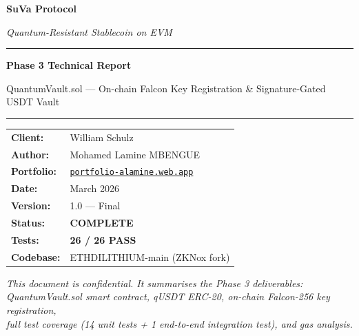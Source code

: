 \documentclass[11pt,a4paper]{article}
\begin{document}

\begin{titlepage}
\centering
\vspace*{2cm}
{\Huge\bfseries\textcolor{suva-blue}{SuVa Protocol}\par}
\vspace{0.5cm}
{\Large\textit{Quantum-Resistant Stablecoin on EVM}\par}
\vspace{1.5cm}
\rule{\linewidth}{0.5pt}
\vspace{0.5cm}
{\LARGE\bfseries Phase 3 Technical Report\par}
\vspace{0.3cm}
{\large QuantumVault.sol --- On-chain Falcon Key Registration \& Signature-Gated USDT Vault\par}
\vspace{0.5cm}
\rule{\linewidth}{0.5pt}
\vspace{2cm}

\begin{tabular}{ll}
\textbf{Client:}    & William Schulz \\[4pt]
\textbf{Author:}    & Mohamed Lamine MBENGUE \\[4pt]
\textbf{Portfolio:} & \href{https://portfolio-alamine.web.app}{\texttt{portfolio-alamine.web.app}} \\[4pt]
\textbf{Date:}      & March 2026 \\[4pt]
\textbf{Version:}   & 1.0 --- Final \\[4pt]
\textbf{Status:}    & \textcolor{pass-green}{\textbf{COMPLETE}} \\[4pt]
\textbf{Tests:}     & \textcolor{pass-green}{\textbf{26 / 26 PASS}} \\[4pt]
\textbf{Codebase:}  & ETHDILITHIUM-main (ZKNox fork) \\
\end{tabular}

\vfill
\begin{tcolorbox}[enhanced,colback=suva-blue!8,colframe=suva-blue,arc=4mm]
\centering\textit{This document is confidential. It summarises the Phase 3 deliverables:\\
QuantumVault.sol smart contract, qUSDT ERC-20, on-chain Falcon-256 key registration,\\
full test coverage (14 unit tests + 1 end-to-end integration test), and gas analysis.}
\end{tcolorbox}
\end{titlepage}
\end{document}
